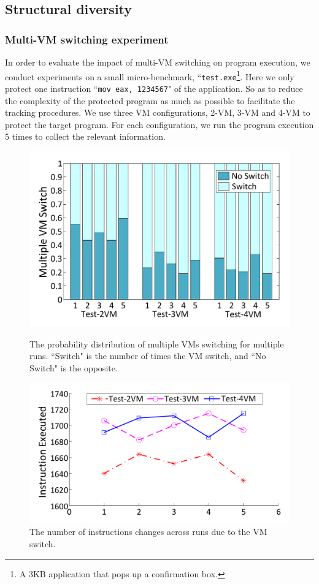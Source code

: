 \documentclass[preprint,12pt,3p]{elsarticle}
\begin{document}
\subsection{Structural diversity}\label{sec:s-d}
\subsubsection{Multi-VM switching experiment}
In order to evaluate the impact of multi-VM switching on program execution, we conduct experiments on 
a small micro-benchmark, ``\texttt{test.exe}\footnote{A 3KB application that pops up a confirmation box.}. Here we only protect one instruction ``\texttt{mov eax, 1234567}" of the application. 
So as to reduce the complexity of the protected program as much as possible to facilitate the tracking procedures.
We use three VM configurations, 2-VM, 3-VM and 4-VM to protect the target program.
For each configuration, we run the program execution 5 times to collect the relevant information.


\begin{figure}[t]
\centering
\begin{minipage}[t]{0.49\linewidth}
\centering
\includegraphics[width=.9\textwidth]{figure/testinfor.pdf}
\caption{The probability distribution of multiple VMs switching for multiple runs. ``Switch" is the number of times the VM switch, and ``No Switch" is the opposite.}\label{fig:Fig.testinfor}
\end{minipage}
\hspace{0.005\textwidth}
\begin{minipage}[t]{0.49\linewidth}
\centering
\includegraphics[width=.9\textwidth]{figure/testinstr.pdf}
\caption{The number of instructions changes across runs due to the VM switch.} \label{fig:Fig.testinstr}
\end{minipage}
\end{figure}
\end{document}
